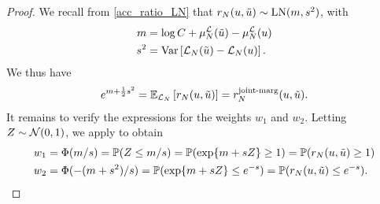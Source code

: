 \documentclass[12pt]{article}
\begin{document}
\begin{proof}
We recall from \ref{acc_ratio_LN} that $\Em[\Ndesign]{\accProbRatio}(\Par, \propPar) \sim \LN(m, s^2)$, with 
\begin{align*}
m &= \log C + \emMean[\Ndesign]{\llik}(\propPar) - \emMean[\Ndesign]{\llik}(\Par) \\
s^2 &= \Var\left[\llikEm[\Ndesign](\propPar) - \llikEm[\Ndesign](\Par) \right]. 
\end{align*}
We thus have 
\begin{align*}
e^{m + \frac{1}{2}s^2} = \E_{\llikEm}\left[\Em[\Ndesign]{\accProbRatio}(\Par, \propPar) \right] 
=  \llikEmJointMarg[\Ndesign]{\accProbRatio}(\Par, \propPar). 
\end{align*}
It remains to verify the expressions for the weights $w_1$ and $w_2$. Letting $Z \sim \Gaussian(0,1)$, 
we apply  to obtain
\begin{align*}
w_1 &= \GaussianCDF(m/s) = \Prob(Z \leq m/s) = \Prob(\Exp{m+sZ} \geq 1) = \Prob(\Em[\Ndesign]{\accProbRatio}(\Par, \propPar) \geq 1) \\
w_2 &= \GaussianCDF(-(m+s^2)/s) = \Prob(\Exp{m + sZ} \leq e^{-s}) = \Prob(\Em[\Ndesign]{\accProbRatio}(\Par, \propPar) \leq e^{-s}).
\end{align*}
\end{proof}
\end{document}
